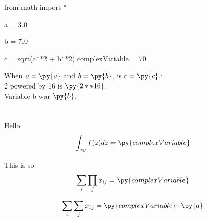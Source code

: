 \documentclass{article}
\begin{document}
\begin{pycode}
from math import *

a = 3.0

b = 7.0

c = sqrt(a**2 + b**2)
complexVariable = 70
\end{pycode}






When $a = \py{a}$ and $b = \py{b}$, is  $c = \py{c}$.i\\
2 powered by 16 is $\py{2**16}$.\\
Variable b war $\py{b}$.\\
\\
\\
Hello
\begin{equation*}
\int_{xy} f(z) dz = \py{complexVariable}
\end{equation*}

This is so
\begin{eqnarray*}
  \sum_i \prod_j x_{ij} = \py{complexVariable}
\end{eqnarray*}

\begin{eqnarray*}
  \sum_i \sum_j x_{ij} = \py{complexVariable}\cdot\py{a}
\end{eqnarray*}
\end{document}
